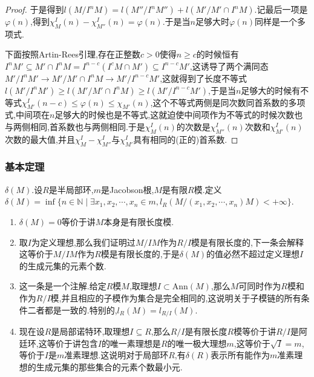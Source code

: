 \begin{enumerate}
\begin{proof}
		于是得到$l(M/I^nM)=l(M''/I^nM'')+l(M'/M'\cap I^nM)$.记最后一项是$\varphi(n)$,得到$\chi_M^I(n)-\chi_{M''}^I(n)=\varphi(n)$.于是当$n$足够大时$\varphi(n)$同样是一个多项式.
		
		下面按照Artin-Rees引理,存在正整数$c>0$使得$n\ge c$的时候恒有$I^nM'\subseteq M'\cap I^nM=I^{n-c}(I^cM\cap M')\subseteq I^{n-c}M'$,这诱导了两个满同态$M'/I^nM'\to M'/M'\cap I^nM\to M'/I^{n-c}M'$,这就得到了长度不等式$l(M'/I^nM')\ge l(M'/M'\cap I^nM)\ge l(M'/I^{n-c}M')$,于是当$n$足够大的时候有不等式$\chi_{M'}^I(n-c)\le\varphi(n)\le\chi_{M'}(n)$,这个不等式两侧是同次数同首系数的多项式,中间项在$n$足够大的时候也是不等式,这就迫使中间项作为不等式的时候次数也与两侧相同,首系数也与两侧相同.于是$\chi_M^I(n)$的次数是$\chi_{M''}^I(n)$次数和$\chi_{M'}^I(n)$次数的最大值,并且$\chi^I_M-\chi^I_{M''}$与$\chi_{M'}^I$具有相同的(正的)首系数.
	\end{proof}
\end{enumerate}
\subsubsection{基本定理}

$\delta(M)$.设$R$是半局部环,$m$是Jacobson根,$M$是有限$R$模.定义$\delta(M)=\inf\{n\in\mathbb{N}\mid\exists x_1,x_2,\cdots,x_n\in m,l_R(M/(x_1,x_2,\cdots,x_n)M)<+\infty\}$.
\begin{enumerate}
	\item $\delta(M)=0$等价于讲$M$本身是有限长度模.
	\item 取$I$为定义理想,那么我们证明过$M/IM$作为$R/I$模是有限长度的,下一条会解释这等价于$M/IM$作为$R$模是有限长度的,于是$\delta(M)$的值必然不超过定义理想$I$的生成元集的元素个数.
	\item 这一条是一个注解.给定$R$模$M$,取理想$I\subset\mathrm{Ann}(M)$,那么$M$可同时作为$R$模和作为$R/I$模,并且相应的子模作为集合是完全相同的,这说明关于子模链的所有条件二者都是一致的.特别的,$l_R(M)=l_{R/I}(M)$.
	\item 现在设$R$是局部诺特环,取理想$I\subseteq R$,那么$R/I$是有限长度$R$模等价于讲$R/I$是阿廷环,这等价于讲包含$I$的唯一素理想是$R$的唯一极大理想$m$,这等价于$\sqrt{I}=m$,等价于$I$是$m$准素理想.这说明对于局部环$R$,有$\delta(R)$表示所有能作为$m$准素理想的生成元集的那些集合的元素个数最小元.
\end{enumerate}


